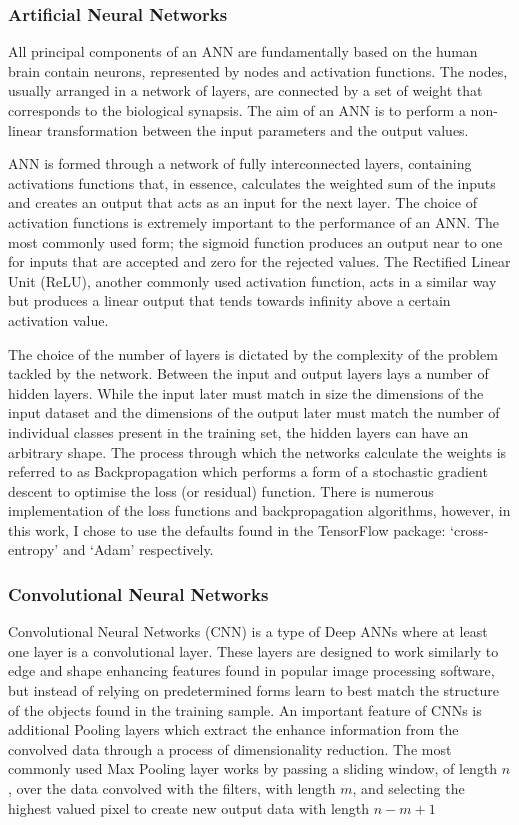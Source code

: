 \subsubsection{Artificial Neural Networks}
All principal components of an ANN are fundamentally based on the human brain contain neurons, represented by nodes and activation functions. The nodes, usually arranged in a network of layers, are connected by a set of weight that corresponds to the biological synapsis. The aim of an ANN is to perform a non-linear transformation between the input parameters and the output values.

ANN is formed through a network of fully interconnected layers, containing activations functions that, in essence, calculates the weighted sum of the inputs and creates an output that acts as an input for the next layer. The choice of activation functions is extremely important to the performance of an ANN. The most commonly used form; the sigmoid function produces an output near to one for inputs that are accepted and zero for the rejected values. The Rectified Linear Unit (ReLU), another commonly used activation function, acts in a similar way but produces a linear output that tends towards infinity above a certain activation value.

The choice of the number of layers is dictated by the complexity of the problem tackled by the network. Between the input and output layers lays a number of hidden layers. While the input later must match in size the dimensions of the input dataset and the dimensions of the output later must match the number of individual classes present in the training set, the hidden layers can have an arbitrary shape. The process through which the networks calculate the weights is referred to as Backpropagation which performs a form of a stochastic gradient descent to optimise the loss (or residual) function. There is numerous implementation of the loss functions and backpropagation algorithms, however, in this work, I chose to use the defaults found in the TensorFlow package: `cross-entropy' and `Adam' respectively.

\subsubsection{Convolutional Neural Networks}
Convolutional Neural Networks (CNN) is a type of Deep ANNs where at least one layer is a convolutional layer. These layers are designed to work similarly to edge and shape enhancing features found in popular image processing software, but instead of relying on predetermined forms learn to best match the structure of the objects found in the training sample. An important feature of CNNs is additional Pooling layers which extract the enhance information from the convolved data through a process of dimensionality reduction. The most commonly used Max Pooling layer works by passing a sliding window, of length $n$, over the data convolved with the filters, with length $m$, and selecting the highest valued pixel to create new output data with length $n-m+1$

